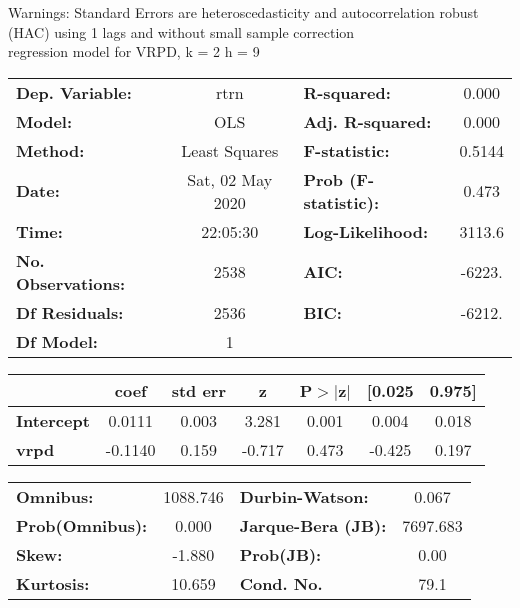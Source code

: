 Warnings: \newline
 [1] Standard Errors are heteroscedasticity and autocorrelation robust (HAC) using 1 lags and without small sample correction\\ 

regression model for VRPD, k = 2 h = 9\begin{center}
\begin{tabular}{lclc}
\toprule
\textbf{Dep. Variable:}    &       rtrn       & \textbf{  R-squared:         } &     0.000   \\
\textbf{Model:}            &       OLS        & \textbf{  Adj. R-squared:    } &     0.000   \\
\textbf{Method:}           &  Least Squares   & \textbf{  F-statistic:       } &    0.5144   \\
\textbf{Date:}             & Sat, 02 May 2020 & \textbf{  Prob (F-statistic):} &    0.473    \\
\textbf{Time:}             &     22:05:30     & \textbf{  Log-Likelihood:    } &    3113.6   \\
\textbf{No. Observations:} &        2538      & \textbf{  AIC:               } &    -6223.   \\
\textbf{Df Residuals:}     &        2536      & \textbf{  BIC:               } &    -6212.   \\
\textbf{Df Model:}         &           1      & \textbf{                     } &             \\
\bottomrule
\end{tabular}
\begin{tabular}{lcccccc}
                   & \textbf{coef} & \textbf{std err} & \textbf{z} & \textbf{P$> |$z$|$} & \textbf{[0.025} & \textbf{0.975]}  \\
\midrule
\textbf{Intercept} &       0.0111  &        0.003     &     3.281  &         0.001        &        0.004    &        0.018     \\
\textbf{vrpd}      &      -0.1140  &        0.159     &    -0.717  &         0.473        &       -0.425    &        0.197     \\
\bottomrule
\end{tabular}
\begin{tabular}{lclc}
\textbf{Omnibus:}       & 1088.746 & \textbf{  Durbin-Watson:     } &    0.067  \\
\textbf{Prob(Omnibus):} &   0.000  & \textbf{  Jarque-Bera (JB):  } & 7697.683  \\
\textbf{Skew:}          &  -1.880  & \textbf{  Prob(JB):          } &     0.00  \\
\textbf{Kurtosis:}      &  10.659  & \textbf{  Cond. No.          } &     79.1  \\
\bottomrule
\end{tabular}
\end{center}

